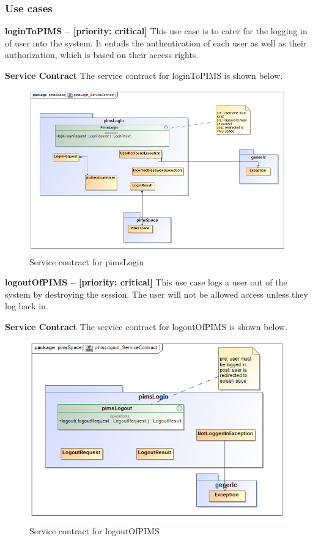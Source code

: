 \subsubsection{Use cases}
\begin{description}
	\item{\textbf{loginToPIMS -- [priority: critical] }}
	This use case is to cater for the logging in of user into the system. It entails the authentication of each user as well as their authorization, which is based on their access rights.
	\begin{description}
	\item{\textbf{Service Contract}} The service contract for loginToPIMS is shown below.
		\begin{figure}[H]
			\centerline{\includegraphics[width=0.7\linewidth]{./Functional_Requirements/Graphics/pimsLogin/pimsLogin_ServiceContract}}
			\caption{Service contract for pimsLogin}
		\end{figure}
	\end{description}
	\item{\textbf{logoutOfPIMS -- [priority: critical]}}
	This use case logs a user out of the system by destroying the session. The user will not be allowed access unless they log back in.
	\begin{description}
	\item{\textbf{Service Contract}} The service contract for logoutOfPIMS is shown below.
		\begin{figure}[H]
			\centerline{\includegraphics[width=0.7\linewidth]{./Functional_Requirements/Graphics/pimsLogin/pimsLogout_ServiceContract}}
			\caption{Service contract for logoutOfPIMS }
		\end{figure}
	\end{description}
	

\end{description}
